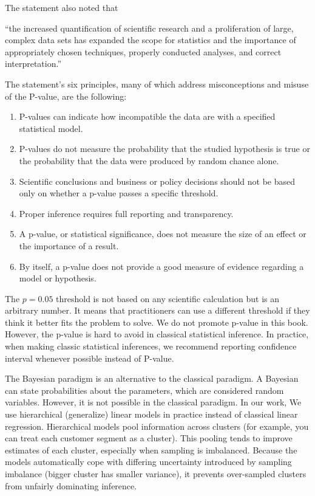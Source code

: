\documentclass[12pt,]{krantz}
\providecommand{\tightlist}{%
  \setlength{\itemsep}{0pt}\setlength{\parskip}{0pt}}
\renewenvironment{quote}{\begin{VF}}{\end{VF}}
\begin{document}
The statement also noted that

\begin{quote}
``the increased quantification of scientific research and a proliferation of large, complex data sets has expanded the scope for statistics and the importance of appropriately chosen techniques, properly conducted analyses, and correct interpretation.''
\end{quote}

The statement's six principles, many of which address misconceptions and misuse of the P-value, are the following:

\begin{enumerate}
\def\labelenumi{\arabic{enumi}.}
\tightlist
\item
  P-values can indicate how incompatible the data are with a specified statistical model.
\item
  P-values do not measure the probability that the studied hypothesis is true or the probability that the data were produced by random chance alone.
\item
  Scientific conclusions and business or policy decisions should not be based only on whether a p-value passes a specific threshold.
\item
  Proper inference requires full reporting and transparency.
\item
  A p-value, or statistical significance, does not measure the size of an effect or the importance of a result.
\item
  By itself, a p-value does not provide a good measure of evidence regarding a model or hypothesis.
\end{enumerate}

The \(p = 0.05\) threshold is not based on any scientific calculation but is an arbitrary number. It means that practitioners can use a different threshold if they think it better fits the problem to solve. We do not promote p-value in this book. However, the p-value is hard to avoid in classical statistical inference. In practice, when making classic statistical inferences, we recommend reporting confidence interval whenever possible instead of P-value.

The Bayesian paradigm is an alternative to the classical paradigm. A Bayesian can state probabilities about the parameters, which are considered random variables. However, it is not possible in the classical paradigm. In our work, We use hierarchical (generalize) linear models in practice instead of classical linear regression. Hierarchical models pool information across clusters (for example, you can treat each customer segment as a cluster). This pooling tends to improve estimates of each cluster, especially when sampling is imbalanced. Because the models automatically cope with differing uncertainty introduced by sampling imbalance (bigger cluster has smaller variance), it prevents over-sampled clusters from unfairly dominating inference.
\end{document}
